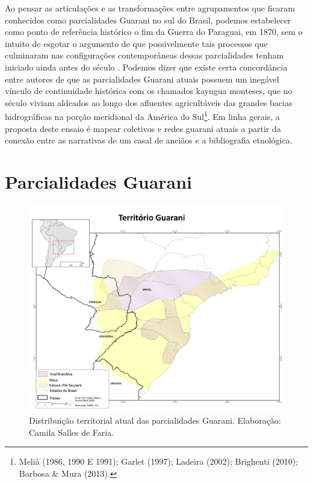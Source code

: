Ao pensar as articulações e as transformações entre agrupamentos que
ficaram conhecidos como parcialidades Guarani no sul do Brasil, podemos
estabelecer como ponto de referência histórico o fim da Guerra do
Paraguai, em 1870, sem o intuito de esgotar o argumento de que
possivelmente tais processos que culminaram nas configurações
contemporâneas dessas parcialidades tenham iniciado ainda antes do
século . Podemos dizer que existe certa concordância entre autores
de que as parcialidades Guarani atuais possuem um inegável vínculo de
continuidade histórica com os chamados kayngua monteses, que no século
 viviam aldeados ao longo dos afluentes agricultáveis das grandes
bacias hidrográficas na porção meridional da América do
Sul\footnote{Melià (1986, 1990 E 1991); Garlet (1997); Ladeira (2002);
Brighenti (2010); Barbosa \& Mura (2013).}. Em linha gerais, a proposta
deste ensaio é mapear coletivos e redes guarani atuais a partir da
conexão entre as narrativas de um casal de anciãos e a bibliografia
etnológica. 

\section{Parcialidades Guarani}

\begin{figure}
  \centering
 \includegraphics[width=\textwidth]{./img/GUARANIS-img7.jpg}	
  \hfill
  \caption{Distribuição territorial atual das parcialidades Guarani. Elaboração: Camila Salles de Faria.}
\end{figure}


